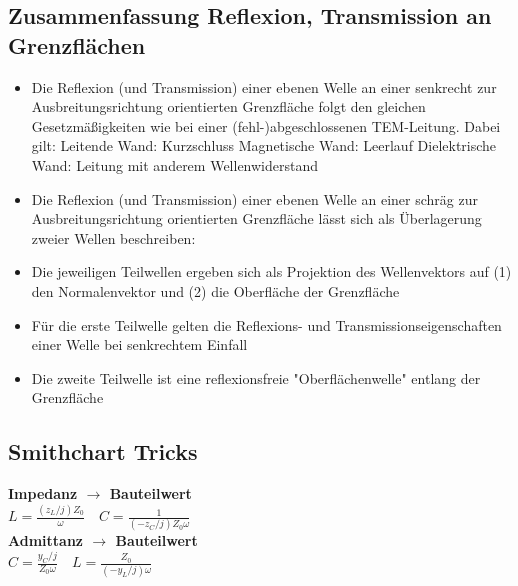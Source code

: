\documentclass[english]{latex4ei/latex4ei_sheet}
\begin{document}
\begin{sectionbox}
	\subsection{Zusammenfassung Reflexion, Transmission an Grenzflächen}
	\begin{itemize}
		\item Die Reflexion (und Transmission) einer ebenen Welle an einer senkrecht zur Ausbreitungsrichtung orientierten Grenzfläche folgt den gleichen Gesetzmäßigkeiten wie bei einer (fehl-)abgeschlossenen TEM-Leitung. Dabei gilt:
		\subitem Leitende Wand: Kurzschluss
		\subitem Magnetische Wand: Leerlauf
		\subitem Dielektrische Wand: Leitung mit anderem Wellenwiderstand
		\item Die Reflexion (und Transmission) einer ebenen Welle an einer schräg zur Ausbreitungsrichtung orientierten Grenzfläche lässt sich als Überlagerung zweier Wellen beschreiben:
		\item Die jeweiligen Teilwellen ergeben sich als Projektion des Wellenvektors auf (1) den Normalenvektor und (2) die Oberfläche der Grenzfläche
		\item Für die erste Teilwelle gelten die Reflexions- und Transmissionseigenschaften einer Welle bei senkrechtem Einfall
		\item Die zweite Teilwelle ist eine reflexionsfreie "Oberflächenwelle" entlang der Grenzfläche
	\end{itemize}
\end{sectionbox}

\begin{sectionbox}
	\subsection{Smithchart Tricks}

	\textbf{Impedanz $\rightarrow$ Bauteilwert}\\
	$L=\frac{(z_L / j)Z_0}{\omega} \quad C=\frac{1}{(-z_C / j)Z_0\omega}$\\
	\textbf{Admittanz $\rightarrow$ Bauteilwert}\\
	$C=\frac{y_C / j}{Z_0 \omega} \quad L = \frac{Z_0}{(-y_L / j) \omega}$\\
\end{sectionbox}
\end{document}
